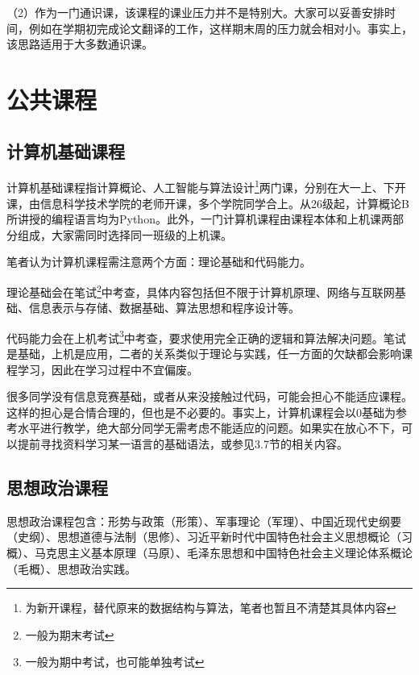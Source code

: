 （2）作为一门通识课，该课程的课业压力并不是特别大。大家可以妥善安排时间，例如在学期初完成论文翻译的工作，这样期末周的压力就会相对小。事实上，该思路适用于大多数通识课。

\section{公共课程}
\subsection{计算机基础课程}

计算机基础课程指计算概论、人工智能与算法设计\footnote{为新开课程，替代原来的数据结构与算法，笔者也暂且不清楚其具体内容}两门课，分别在大一上、下开课，由信息科学技术学院的老师开课，多个学院同学合上。从26级起，计算概论B所讲授的编程语言均为Python。此外，一门计算机课程由课程本体和上机课两部分组成，大家需同时选择同一班级的上机课。

\vspace{10pt}

笔者认为计算机课程需注意两个方面：理论基础和代码能力。

\vspace{10pt}

理论基础会在笔试\footnote{一般为期末考试}中考查，具体内容包括但不限于计算机原理、网络与互联网基础、信息表示与存储、数据基础、算法思想和程序设计等。

\vspace{10pt}

代码能力会在上机考试\footnote{一般为期中考试，也可能单独考试}中考查，要求使用完全正确的逻辑和算法解决问题。笔试是基础，上机是应用，二者的关系类似于理论与实践，任一方面的欠缺都会影响课程学习，因此在学习过程中不宜偏废。

\vspace{10pt}

很多同学没有信息竞赛基础，或者从来没接触过代码，可能会担心不能适应课程。这样的担心是合情合理的，但也是不必要的。事实上，计算机课程会以0基础为参考水平进行教学，绝大部分同学无需考虑不能适应的问题。如果实在放心不下，可以提前寻找资料学习某一语言的基础语法，或参见3.7节的相关内容。

\subsection{思想政治课程}
思想政治课程包含：形势与政策（形策）、军事理论（军理）、中国近现代史纲要（史纲）、思想道德与法制（思修）、习近平新时代中国特色社会主义思想概论（习概）、马克思主义基本原理（马原）、毛泽东思想和中国特色社会主义理论体系概论（毛概）、思想政治实践。

